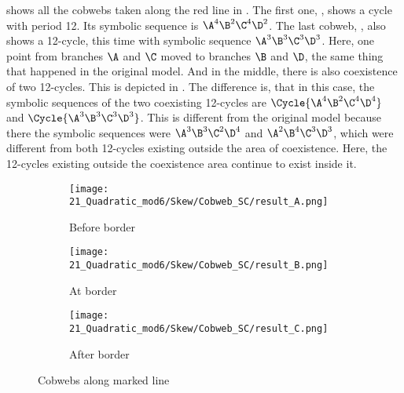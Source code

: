  shows all the cobwebs taken along the red line in .
The first one, , shows a cycle with period 12.
Its symbolic sequence is $\A^4\B^2\C^4\D^2$.
The last cobweb, , also shows a 12-cycle, this time with symbolic sequence $\A^3\B^3\C^3\D^3$.
Here, one point from branches $\A$ and $\C$ moved to branches $\B$ and $\D$, the same thing that happened in the original model.
And in the middle, there is also coexistence of two 12-cycles.
This is depicted in .
The difference is, that in this case, the symbolic sequences of the two coexisting 12-cycles are $\Cycle{\A^4\B^2\C^4\D^4}$ and $\Cycle{\A^3\B^3\C^3\D^3}$.
This is different from the original model because there the symbolic sequences were $\A^3\B^3\C^2\D^4$ and $\A^2\B^4\C^3\D^3$, which were different from both 12-cycles existing outside the area of coexistence.
Here, the 12-cycles existing outside the coexistence area continue to exist inside it.

\begin{figure}
    \centering
    \begin{subfigure}{0.3\textwidth}
        \centering
        \texttt{[image: 21\_Quadratic\_mod6/Skew/Cobweb\_SC/result\_A.png]}
        \caption{Before border}
        \label{fig:quad.full.skew.c.CobwebA}
    \end{subfigure}
    \begin{subfigure}{0.3\textwidth}
        \centering
        \texttt{[image: 21\_Quadratic\_mod6/Skew/Cobweb\_SC/result\_B.png]}
        \caption{At border}
        \label{fig:quad.full.skew.c.CobwebB}
    \end{subfigure}
    \begin{subfigure}{0.3\textwidth}
        \centering
        \texttt{[image: 21\_Quadratic\_mod6/Skew/Cobweb\_SC/result\_C.png]}
        \caption{After border}
        \label{fig:quad.full.skew.c.CobwebC}
    \end{subfigure}
    \caption{Cobwebs along marked line}
    \label{fig:quad.full.skew.c.Cobwebs}
\end{figure}

